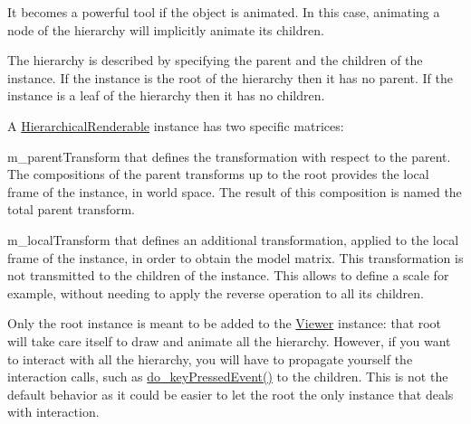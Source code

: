 It becomes a powerful tool if the object is animated. In this case, animating a node of the hierarchy will implicitly animate its children.

The hierarchy is described by specifying the parent and the children of the instance. If the instance is the root of the hierarchy then it has no parent. If the instance is a leaf of the hierarchy then it has no children.

A \hyperlink{classHierarchicalRenderable}{Hierarchical\+Renderable} instance has two specific matrices\+:
\begin{DoxyItemize}
\item m\+\_\+parent\+Transform that defines the transformation with respect to the parent. The compositions of the parent transforms up to the root provides the local frame of the instance, in world space. The result of this composition is named the total parent transform.
\item m\+\_\+local\+Transform that defines an additional transformation, applied to the local frame of the instance, in order to obtain the model matrix. This transformation is not transmitted to the children of the instance. This allows to define a scale for example, without needing to apply the reverse operation to all its children.
\end{DoxyItemize}

Only the root instance is meant to be added to the \hyperlink{classViewer}{Viewer} instance\+: that root will take care itself to draw and animate all the hierarchy. However, if you want to interact with all the hierarchy, you will have to propagate yourself the interaction calls, such as \hyperlink{classRenderable_a49e39be950dca7a925b8b79c13241e6b}{do\+\_\+key\+Pressed\+Event()} to the children. This is not the default behavior as it could be easier to let the root the only instance that deals with interaction. 

